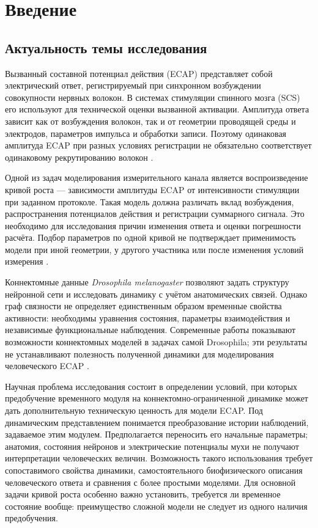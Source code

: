 \chapter*{Введение}
\section*{Актуальность темы исследования}
Вызванный составной потенциал действия (ECAP) представляет собой электрический ответ, регистрируемый при синхронном возбуждении совокупности нервных волокон. В системах стимуляции спинного мозга (SCS) его используют для технической оценки вызванной активации. Амплитуда ответа зависит как от возбуждения волокон, так и от геометрии проводящей среды и электродов, параметров импульса и обработки записи. Поэтому одинаковая амплитуда ECAP при разных условиях регистрации не обязательно соответствует одинаковому рекрутированию волокон \cite{ecapmodel,posture}.

Одной из задач моделирования измерительного канала является воспроизведение кривой роста --- зависимости амплитуды ECAP от интенсивности стимуляции при заданном протоколе. Такая модель должна различать вклад возбуждения, распространения потенциалов действия и регистрации суммарного сигнала. Это необходимо для исследования причин изменения ответа и оценки погрешности расчёта. Подбор параметров по одной кривой не подтверждает применимость модели при иной геометрии, у другого участника или после изменения условий измерения \cite{ecapmodel,posture,s787}.

Коннектомные данные \textit{Drosophila melanogaster} позволяют задать структуру нейронной сети и исследовать динамику с учётом анатомических связей. Однако граф связности не определяет единственным образом временные свойства активности: необходимы уравнения состояния, параметры взаимодействия и независимые функциональные наблюдения. Современные работы показывают возможности коннектомных моделей в задачах самой Drosophila; эти результаты не устанавливают полезность полученной динамики для моделирования человеческого ECAP \cite{s743,s744,s775}.

Научная проблема исследования состоит в определении условий, при которых предобучение временного модуля на коннектомно-ограниченной динамике может дать дополнительную техническую ценность для модели ECAP. Под динамическим представлением понимается преобразование истории наблюдений, задаваемое этим модулем. Предполагается переносить его начальные параметры; анатомия, состояния нейронов и электрические потенциалы мухи не получают интерпретации человеческих величин. Возможность такого использования требует сопоставимого свойства динамики, самостоятельного биофизического описания человеческого ответа и сравнения с более простыми моделями. Для основной задачи кривой роста особенно важно установить, требуется ли временное состояние вообще: преимущество сложной модели не следует из одного наличия предобучения.

